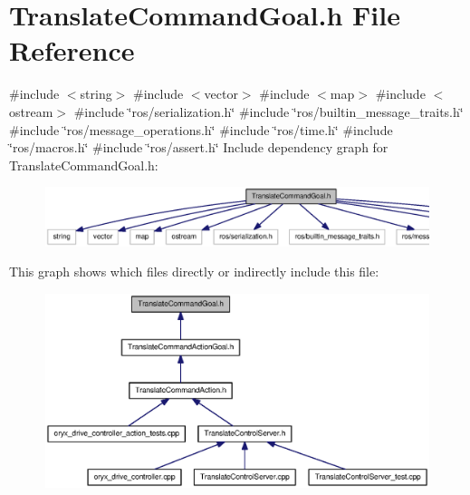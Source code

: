 \section{\-Translate\-Command\-Goal.\-h \-File \-Reference}
\label{TranslateCommandGoal_8h}
{\ttfamily \#include $<$string$>$}\*
{\ttfamily \#include $<$vector$>$}\*
{\ttfamily \#include $<$map$>$}\*
{\ttfamily \#include $<$ostream$>$}\*
{\ttfamily \#include \char`\"{}ros/serialization.\-h\char`\"{}}\*
{\ttfamily \#include \char`\"{}ros/builtin\-\_\-message\-\_\-traits.\-h\char`\"{}}\*
{\ttfamily \#include \char`\"{}ros/message\-\_\-operations.\-h\char`\"{}}\*
{\ttfamily \#include \char`\"{}ros/time.\-h\char`\"{}}\*
{\ttfamily \#include \char`\"{}ros/macros.\-h\char`\"{}}\*
{\ttfamily \#include \char`\"{}ros/assert.\-h\char`\"{}}\*
\-Include dependency graph for \-Translate\-Command\-Goal.\-h\-:
\nopagebreak
\begin{figure}[H]
\begin{center}
\leavevmode
\includegraphics[width=350pt]{TranslateCommandGoal_8h__incl}
\end{center}
\end{figure}
\-This graph shows which files directly or indirectly include this file\-:
\nopagebreak
\begin{figure}[H]
\begin{center}
\leavevmode
\includegraphics[width=350pt]{TranslateCommandGoal_8h__dep__incl}
\end{center}
\end{figure}
